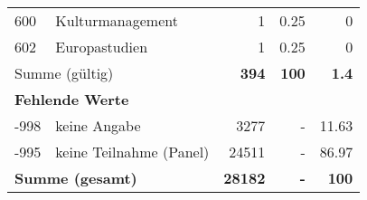 \begin{longtable}{lXrrr}
        600 & \multicolumn{1}{X}{Kulturmanagement} & %
          \num{1} &
          \num[round-mode=places,round-precision=2]{0,25} &
          \num[round-mode=places,round-precision=2]{0} \\

        602 & \multicolumn{1}{X}{Europastudien} & %
          \num{1} &
          \num[round-mode=places,round-precision=2]{0,25} &
          \num[round-mode=places,round-precision=2]{0} \\

     \midrule
     \multicolumn{2}{l}{Summe (gültig)} &
       \textbf{\num{394}} &
     \textbf{100} &
       \textbf{\num[round-mode=places,round-precision=2]{1,4}} \\
     \multicolumn{5}{l}{\textbf{Fehlende Werte}}\\
       -998 &
       keine Angabe &
         \num{3277} &
        - &
         \num[round-mode=places,round-precision=2]{11,63} \\
       -995 &
       keine Teilnahme (Panel) &
         \num{24511} &
        - &
         \num[round-mode=places,round-precision=2]{86,97} \\
     \midrule
     \multicolumn{2}{l}{\textbf{Summe (gesamt)}} &
          \textbf{\num{28182}} &
        \textbf{-} &
        \textbf{100} \\
     \bottomrule
     \end{longtable}
     
